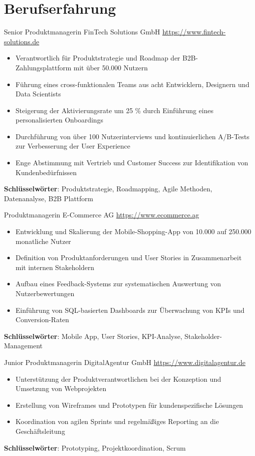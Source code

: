 \documentclass[a4paper, serif, 10pt]{moderncv}
\begin{document}
\section{Berufserfahrung}

        {Senior Produktmanagerin}
        {FinTech Solutions GmbH}
        {\url{https://www.fintech-solutions.de}}
        {}
        {\begin{itemize}
\item Verantwortlich für Produktstrategie und Roadmap der B2B-Zahlungsplattform mit über 50.000 Nutzern
\item Führung eines cross-funktionalen Teams aus acht Entwicklern, Designern und Data Scientists
\item Steigerung der Aktivierungsrate um 25 \% durch Einführung eines personalisierten Onboardings
\item Durchführung von über 100 Nutzerinterviews und kontinuierlichen A/B-Tests zur Verbesserung der User Experience
\item Enge Abstimmung mit Vertrieb und Customer Success zur Identifikation von Kundenbedürfnissen
\end{itemize}
\textbf{Schlüsselwörter}: Produktstrategie, Roadmapping, Agile Methoden, Datenanalyse, B2B Plattform}

        {Produktmanagerin}
        {E-Commerce AG}
        {\url{https://www.ecommerce.ag}}
        {}
        {\begin{itemize}
\item Entwicklung und Skalierung der Mobile-Shopping-App von 10.000 auf 250.000 monatliche Nutzer
\item Definition von Produktanforderungen und User Stories in Zusammenarbeit mit internen Stakeholdern
\item Aufbau eines Feedback-Systems zur systematischen Auswertung von Nutzerbewertungen
\item Einführung von SQL-basierten Dashboards zur Überwachung von KPIs und Conversion-Raten
\end{itemize}
\textbf{Schlüsselwörter}: Mobile App, User Stories, KPI-Analyse, Stakeholder-Management}

        {Junior Produktmanagerin}
        {DigitalAgentur GmbH}
        {\url{https://www.digitalagentur.de}}
        {}
        {\begin{itemize}
\item Unterstützung der Produktverantwortlichen bei der Konzeption und Umsetzung von Webprojekten
\item Erstellung von Wireframes und Prototypen für kundenspezifische Lösungen
\item Koordination von agilen Sprints und regelmäßiges Reporting an die Geschäftsleitung
\end{itemize}
\textbf{Schlüsselwörter}: Prototyping, Projektkoordination, Scrum}
\end{document}
